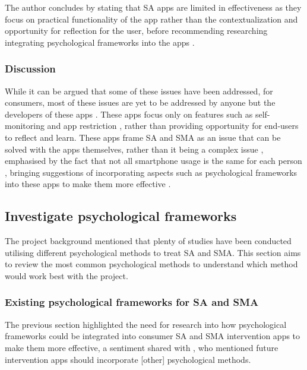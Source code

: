 \documentclass[12pt]{article}
\begin{document}
The author concludes by stating that SA apps are limited in effectiveness as they focus on practical
functionality of the app rather than the contextualization and opportunity for reflection for the user, before
recommending researching integrating psychological frameworks into the apps
\autocite{RefWorks:RefID:35-dosselaar2017smartphone}.

\subsubsection{Discussion}
While it can be argued that some of these issues have been addressed, for consumers, most of
these issues are yet to be addressed by anyone but the developers of these apps 
\autocite{RefWorks:RefID:35-dosselaar2017smartphone}. These apps focus only on features
such as self-monitoring and app restriction \autocite{RefWorks:RefID:74-löchtefeld2013appdetox}, rather than 
providing opportunity for end-users to reflect and learn. These apps frame SA and SMA as an issue 
that can be solved with the apps themselves, rather than it being a complex issue
\autocite{RefWorks:RefID:128-santhosh2025augmented}, emphasised by the fact that not all smartphone usage 
is the same for each person \autocite{RefWorks:RefID:126-petrucco2021user}, bringing suggestions of
incorporating aspects such as psychological frameworks into these apps to make them more effective 
\autocite{RefWorks:RefID:35-dosselaar2017smartphone}.


\subsection{Investigate psychological frameworks}
The project background mentioned that plenty of studies have been conducted utilising different
psychological methods to treat SA and SMA. This section aims to review the most common psychological methods
to understand which method would work best with the project.

\subsubsection{Existing psychological frameworks for SA and SMA}
The previous section highlighted the need for research into how psychological frameworks could be integrated into 
consumer SA and SMA intervention apps to make them more effective, a sentiment shared with 
\textcite{RefWorks:RefID:75-oliveira2021effectiveness}, who mentioned future intervention apps should 
incorporate [other] psychological methods. \newline
\end{document}
